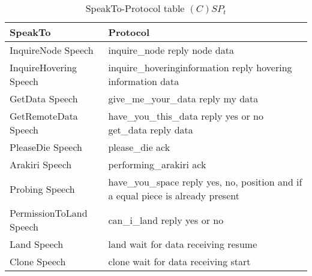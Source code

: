 \begin{table}[H]
	\centering
	\begin{tabular}{|p{4cm}|p{8cm}|}
			\hline
			\textbf{SpeakTo} & \textbf{Protocol} \\
			\hline
			InquireNode Speech & inquire\_node\newline
			                     reply node data \\
			\hline
      InquireHovering Speech & inquire\_hoveringinformation\newline
                               reply hovering information data\\
			\hline
			GetData Speech & give\_me\_your\_data
			                  reply my data\\
			\hline
      GetRemoteData Speech &  have\_you\_this\_data\newline
                              reply yes or no\newline
                              get\_data\newline
                              reply data \\
			\hline
			PleaseDie Speech & please\_die\newline
			                   ack \\
			\hline
			Arakiri Speech & performing\_arakiri\newline
			                  ack\\
			\hline
      Probing Speech & have\_you\_space\newline
                       reply yes, no, position and if a equal piece is already present\\
			\hline
      PermissionToLand Speech & can\_i\_land\newline
                                reply yes or no\\
			\hline
      Land Speech & land\newline
                    wait for data receiving\newline
                    resume\\
			\hline
      Clone Speech & clone\newline
                     wait for data receiving\newline
                     start\\
			\hline
		\end{tabular}
	\caption{SpeakTo-Protocol table $(C)SP_t$}
	\label{tab:cspt}
\end{table}

